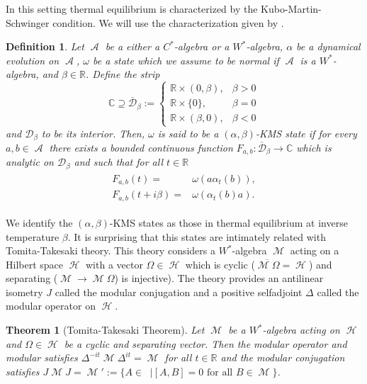 \documentclass{article}
\DeclareMathOperator{\M}{\mathcal{M}}
\DeclareMathOperator{\A}{\mathcal{A}}
\DeclareMathOperator{\h}{\mathcal{H}}
\DeclareMathOperator{\BH}{\mathcal{B}(\h)}
\newtheorem{definition}{Definition}[section]
\newtheorem{theorem}{Theorem}[section]
\begin{document}
In this setting thermal equilibrium is characterized by the Kubo-Martin-Schwinger condition\cite{Haag1967, Kubo1957, Martin1959}. We will use the characterization given by \cite{Duvenhage1999}.
\begin{definition}
	Let $\A$ be a either a $C^*$-algebra or a $W^*$-algebra, $\alpha$ be a dynamical evolution on $\A$, $\omega$ be a state which we assume to be normal if $\A$ is a $W^*$-algebra, and $\beta\in\mathbb{R}$. Define the strip
	\begin{equation}
	\mathbb{C}\supseteq\overline{\mathcal{D}}_\beta:=\begin{cases}
	\mathbb{R}\times(0,\beta), & \beta>0\\
	\mathbb{R}\times\{0\}, & \beta = 0\\
	\mathbb{R}\times(\beta,0), & \beta<0
	\end{cases}
	\end{equation}
and $\mathcal{D}_\beta$ to be its interior. Then, $\omega$ is said to be a $(\alpha,\beta)$-KMS state if for every $a,b\in\A$ there exists a bounded continuous function $F_{a,b}:\overline{\mathcal{D}}_\beta\rightarrow\mathbb{C}$ which is analytic on $\mathcal{D}_\beta$ and such that for all $t\in\mathbb{R}$
\begin{align}
\begin{split}
F_{a,b}(t)=&\omega(a\alpha_t(b)),\\
F_{a,b}(t+i\beta)=&\omega(\alpha_t(b)a).
\end{split}
\end{align}
\end{definition}
We identify the $(\alpha,\beta)$-KMS states as those in thermal equilibrium at inverse temperature $\beta$. It is surprising that this states are intimately related with Tomita-Takesaki theory\cite{Takesaki1970}. This theory considers a $W^*$-algebra $\M$ acting on a Hilbert space $\h$ with a vector $\Omega\in\h$ which is cyclic ($\overline{\M\Omega}=\h$) and separating ($\M\rightarrow\M\Omega$) is injective). The theory provides an antilinear isometry $J$ called the modular conjugation and a positive selfadjoint $\Delta$ called the modular operator on $\h$.
\begin{theorem}[Tomita-Takesaki Theorem]
Let $\M$ be a $W^*$-algebra acting on $\h$ and $\Omega\in\h$ be a cyclic and separating vector. Then the modular operator and modular satisfies $\Delta^{-it}\M\Delta^{it}=\M$ for all $t\in\mathbb{R}$ and the modular conjugation satisfies $J\M J=\M':=\{A\in\BH|[A,B]=0\text{ for all }B\in\M\}$.
\end{theorem}
\end{document}
